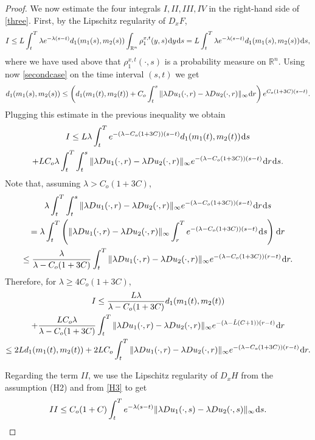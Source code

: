 \documentclass{amsart}
\theoremstyle{remark}
\theoremstyle{definition}
\theoremstyle{Claim}
\newcommand{\R}{\mathbb{R}}
\newcommand{\dd}{\hspace{0.7pt}{\rm d}}
\theoremstyle{plain}
\begin{document}
\begin{proof}
	We now estimate the four integrals $I,II,III, IV$ in the right-hand side of \eqref{three}. First, by the Lipschitz regularity of $D_x F$,
	\[
	I \le L \int_{t}^{T}  \lambda e^{-\lambda (s-t)} d_1(m_1(s), m_2(s)) \int_{\R^n}  \rho_1^{x, t}(y,s) \dd y\dd s=L \int_{t}^{T}  \lambda e^{-\lambda (s-t)} d_1(m_1(s), m_2(s))\dd s,
	\]
	where we have used above that $\rho_1^{x, t}(\cdot,s)$ is a probability measure on $\mathbb{R}^n$. Using now \eqref{secondcase} on the time interval $(s,t)$ we get
	\[
	d_1(m_1(s), m_2(s))\le \left(d_1(m_1(t), m_2(t)) + {C_o} \int_t^s  \| \lambda D u_1(\cdot,r) - \lambda D u_2(\cdot,r) \|_\infty \dd r\right)e^{{C_o(1+3C)}(s-t)}.
\]
	Plugging this estimate in the previous inequality we obtain
	\begin{multline*}
	I \le L \lambda \int_{t}^{T}   e^{-(\lambda - {C_o(1+3C)}) (s-t)} d_1(m_1(t), m_2(t)) \dd s  \\+
	L  {C_o}\lambda  \int_{t}^{T} \int_t^s  \| \lambda D u_1(\cdot,r) - \lambda D u_2(\cdot,r) \|_\infty  e^{-(\lambda -  {C_o(1+3C)} ) (s-t)} \dd r \dd s.
	\end{multline*}
	Note that, assuming $\lambda >  {C_o(1+3C)}$,
	\begin{multline}\label{scambioint}
	\lambda  \int_{t}^{T} \int_t^s  \| \lambda D u_1(\cdot,r) - \lambda D u_2(\cdot,r) \|_\infty  e^{-(\lambda - {C_o(1+3C)}) (s-t)} \dd r \dd s  \\=
	\lambda  \int_{t}^{T}\left( \| \lambda D u_1(\cdot,r) - \lambda D u_2(\cdot,r) \|_\infty \int_r^{T}    e^{-(\lambda - {C_o(1+3C)}) (s-t)}  \dd s \right) \dd r  \\\leq
	\frac{\lambda}{\lambda - {C_o(1+3C)}} \int_{t}^{T} \| \lambda D u_1(\cdot,r) - \lambda D u_2(\cdot,r) \|_\infty e^{-(\lambda -  {C_o(1+3C)}) (r-t)}  \dd r.
	\end{multline}
	Therefore, for $\lambda \ge   {4C_o(1+3C)}$,
	\begin{multline*}
	I \le \frac{L \lambda}{\lambda - {C_o(1+3C)}}  d_1(m_1(t), m_2(t)) \\ + \frac{ L  {C_o}\lambda}{\lambda -  {C_o(1+3C)}}  \int_{t}^{T} \| \lambda D u_1(\cdot,r) - \lambda D u_2(\cdot,r) \|_\infty e^{-(\lambda - \tilde{L} (C+1)) (r-t)}  \dd r  \\\le
	2L  d_1(m_1(t), m_2(t)) + 2 L{C_o}  \int_{t}^{T} \| \lambda D u_1(\cdot,r) - \lambda D u_2(\cdot,r) \|_\infty e^{-(\lambda -  {C_o(1+3C)}) (r-t)}  \dd r.
	\end{multline*}
	
	\smallskip
	Regarding the term $II$, we use the Lipschitz regularity of $D_x H$ from the assumption (H2) and from \eqref{H3} to get
	\[
	II \le C_o(1+C) \int_{t}^{T} e^{-\lambda (s-t)} \| \lambda D u_1(\cdot,s) - \lambda D u_2(\cdot,s) \|_\infty \dd s.
	\]
	

\end{proof}
\end{document}
